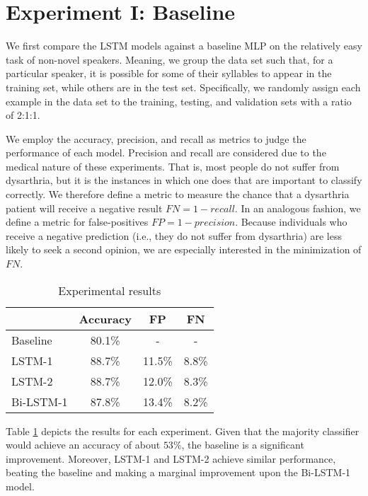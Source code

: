 \section{Experiment I: Baseline}
We first compare the LSTM models against a baseline MLP on the relatively easy task of non-novel speakers. Meaning, we group the data set such that, for a particular speaker, it is possible for some of their syllables to appear in the training set, while others are in the test set. Specifically, we randomly assign each example in the data set to the training, testing, and validation sets with a ratio of 2:1:1. 

We employ the accuracy, precision, and recall \cite{torgo2009precision} as metrics to judge the performance of each model. Precision and recall are considered due to the medical nature of these experiments. That is, most people do not suffer from dysarthria, but it is the instances in which one does that are important to classify correctly. We therefore define a metric to measure the chance that a dysarthria patient will receive a negative result $FN = 1 - recall$. In an analogous fashion, we define a metric for false-positives $FP = 1 - precision$. Because individuals who receive a negative prediction (i.e., they do not suffer from dysarthria) are less likely to seek a second opinion, we are especially interested in the minimization of $FN$. 

\begin{table}[h]
\centering
\caption{Experimental results}
\begin{tabular}{|l|c|c|c|}
\hline
\multicolumn{1}{|c|}{}    &   Accuracy     &   FP         &     FN         \\ \hline
Baseline                    &   80.1\%     &   -          &     -           \\ \hline
LSTM-1                      &   88.7\%     &   11.5\%     &     8.8\%       \\ \hline
LSTM-2                      &   88.7\%     &   12.0\%     &     8.3\%       \\ \hline
Bi-LSTM-1                   &   87.8\%     &   13.4\%     &     8.2\%      \\ \hline
\end{tabular}
\label{tab-exp-1-results}
\end{table}

Table \ref{tab-exp-1-results} depicts the results for each experiment. Given that the majority classifier would achieve an accuracy of about $53\%$, the baseline is a significant improvement. Moreover, LSTM-1 and LSTM-2 achieve similar performance, beating the baseline and making a marginal improvement upon the Bi-LSTM-1 model.

